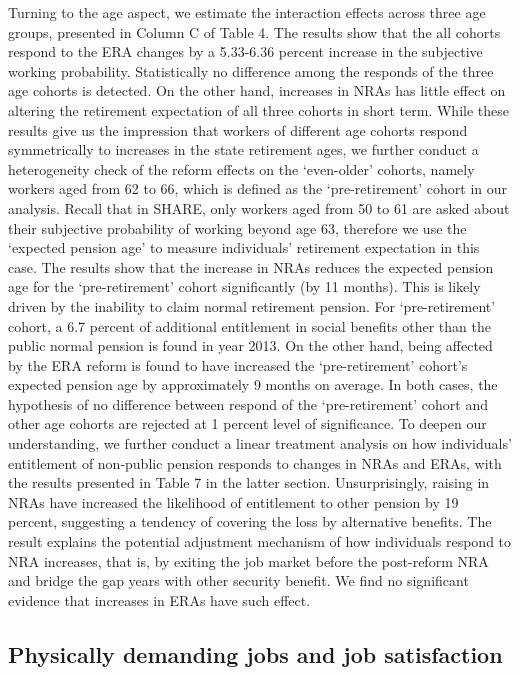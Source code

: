 \documentclass[a4paper]{article}
\begin{document}
Turning to the age aspect, we estimate the interaction effects across three age groups, presented in Column C of Table 4. The results show that the all cohorts respond to the ERA changes by a 5.33-6.36 percent increase in the subjective working probability. Statistically no difference among the responds of the three age cohorts is detected. On the other hand, increases in NRAs has little effect on altering the retirement expectation of all three cohorts in short term. While these results give us the impression that workers of different age cohorts respond symmetrically to increases in the state retirement ages, we further conduct a heterogeneity check of the reform effects on the ‘even-older’ cohorts, namely workers aged from 62 to 66, which is defined as the ‘pre-retirement’ cohort in our analysis. Recall that in SHARE, only workers aged from 50 to 61 are asked about their subjective probability of working beyond age 63, therefore we use the ‘expected pension age’ to measure individuals’ retirement expectation in this case. The results show that the increase in NRAs reduces the expected pension age for the ‘pre-retirement’ cohort significantly (by 11 months). This is likely driven by the inability to claim normal retirement pension. For ‘pre-retirement’ cohort, a 6.7 percent of additional entitlement in social benefits other than the public normal pension is found in year 2013. On the other hand, being affected by the ERA reform is found to have increased the ‘pre-retirement’ cohort’s expected pension age by approximately 9 months on average. In both cases, the hypothesis of no difference between respond of the ‘pre-retirement’ cohort and other age cohorts are rejected at 1 percent level of significance. To deepen our understanding, we further conduct a linear treatment analysis on how individuals’ entitlement of non-public pension responds to changes in NRAs and ERAs, with the results presented in Table 7 in the latter section. Unsurprisingly, raising in NRAs have increased the likelihood of entitlement to other pension by 19 percent, suggesting a tendency of covering the loss by alternative benefits. The result explains the potential adjustment mechanism of how individuals respond to NRA increases, that is, by exiting the job market before the post-reform NRA and bridge the gap years with other security benefit. We find no significant evidence that increases in ERAs have such effect. 


\subsection{Physically demanding jobs and job satisfaction}
\end{document}
